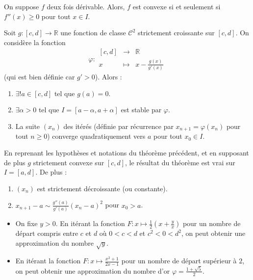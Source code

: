 	\begin{proposition}
		On suppose $f$ deux fois dérivable. Alors, $f$ est convexe si et seulement si $f''(x) \geq 0$ pour tout $x \in I$.
	\end{proposition}


	\begin{application}
		Soit $g : [c, d] \rightarrow \mathbb{R}$ une fonction de classe $\mathcal{C}^2$ strictement croissante sur $[c, d]$. On considère la fonction
		\[ \varphi :
		\begin{array}{ccc}
			[c, d] &\rightarrow& \mathbb{R} \\
			x &\mapsto& x - \frac{g(x)}{g'(x)}
		\end{array}
		\]
		(qui est bien définie car $g' > 0$). Alors :
		\begin{enumerate}[label=(\roman*)]
			\item $\exists! a \in [c, d]$ tel que $g(a) = 0$.
			\item $\exists \alpha > 0$ tel que $I = [a - \alpha, a + \alpha]$ est stable par $\varphi$.
			\item La suite $(x_n)$ des itérés (définie par récurrence par $x_{n+1} = \varphi(x_n)$ pour tout $n \geq 0$) converge quadratiquement vers $a$ pour tout $x_0 \in I$.
		\end{enumerate}
	\end{application}

	\begin{corollary}
		En reprenant les hypothèses et notations du théorème précédent, et en supposant de plus $g$ strictement convexe sur $[c, d]$, le résultat du théorème est vrai sur $I = [a, d]$. De plus :
		\begin{enumerate}[label=(\roman*)]
			\item $(x_n)$ est strictement décroissante (ou constante).
			\item $x_{n+1} - a \sim \frac{g''(a)}{g'(a)} (x_n - a)^2$ pour $x_0 > a$.
		\end{enumerate}
	\end{corollary}

	\begin{example}
  	\begin{itemize}
  		\item On fixe $y > 0$. En itérant la fonction $F : x \mapsto \frac{1}{2} \left( x + \frac{y}{x} \right)$ pour un nombre de départ compris entre $c$ et $d$ où $0 < c < d$ et $c^2 < 0 < d^2$, on peut obtenir une approximation du nombre $\sqrt{y}$.
  		\item En itérant la fonction $F : x \mapsto \frac{x^2+1}{2x-1}$ pour un nombre de départ supérieur à $2$, on peut obtenir une approximation du nombre d'or $\varphi = \frac{1+\sqrt{5}}{2}$.
  	\end{itemize}
  \end{example}

